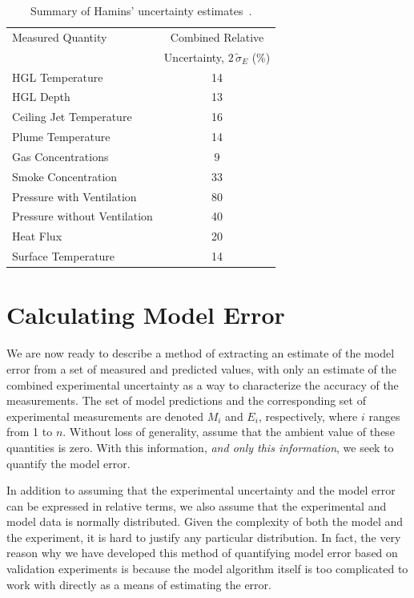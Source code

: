\begin{table}[ht!]
\caption{Summary of Hamins' uncertainty estimates~\cite{NUREG_1824}. }
\begin{center}
\begin{tabular}{|l|c|}
\hline
Measured Quantity               & Combined Relative       \\
                                & Uncertainty, $2 \, \widetilde{\sigma}_E$ (\%)       \\ \hline \hline
HGL Temperature                 & 14    \\ \hline
HGL Depth                       & 13    \\ \hline
Ceiling Jet Temperature         & 16    \\ \hline
Plume Temperature               & 14    \\ \hline
Gas Concentrations              & 9     \\ \hline
Smoke Concentration             & 33    \\ \hline
Pressure with Ventilation       & 80    \\ \hline
Pressure without Ventilation    & 40    \\ \hline
Heat Flux                       & 20    \\ \hline
Surface Temperature             & 14    \\ \hline
\end{tabular}
\end{center}
\label{Uncertainty}
\end{table}


\section{Calculating Model Error}

We are now ready to describe a method of extracting an estimate of the model error from a set of measured and predicted values, with only an estimate of
the combined experimental uncertainty as a way to characterize the accuracy of the measurements.
The set of model predictions and the corresponding set of experimental measurements are denoted
$M_i$ and $E_i$, respectively, where $i$ ranges from 1 to $n$. Without loss of generality, assume that the
ambient value of these quantities is zero. With this information, {\em and only this information}, we seek to quantify the model error.

In addition to assuming that the experimental uncertainty and the model error can be expressed in relative terms, we also assume that
the experimental and model data is normally distributed. Given the complexity of both the model and the experiment, it is hard to justify
any particular distribution. In fact, the very reason why we have developed this method of quantifying model error based on validation
experiments is because the model algorithm itself is too complicated to work with directly as a means of estimating the error.

